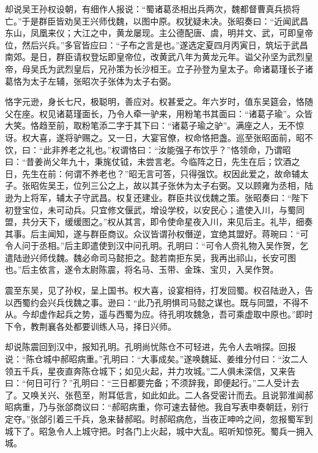 却说吴王孙权设朝，有细作人报说：“蜀诸葛丞相出兵两次，魏都督曹真兵损将亡。”于是群臣皆劝吴王兴师伐魏，以图中原。权犹疑未决。张昭奏曰：“近闻武昌东山，凤凰来仪；大江之中，黄龙屡现。主公德配唐、虞，明并文、武，可即皇帝位，然后兴兵。”多官皆应曰：“子布之言是也。”遂选定夏四月丙寅日，筑坛于武昌南郊。是日，群臣请权登坛即皇帝位，改黄武八年为黄龙元年。谥父孙坚为武烈皇帝，母吴氏为武烈皇后，兄孙策为长沙桓王。立子孙登为皇太子。命诸葛瑾长子诸葛恪为太子左辅，张昭次子张体为太子右弼。

恪字元逊，身长七尺，极聪明，善应对。权甚爱之。年六岁时，值东吴筵会，恪随父在座。权见诸葛瑾面长，乃令人牵一驴来，用粉笔书其面曰：“诸葛子瑜”。众皆大笑。恪趋至前，取粉笔添二字于其下曰：“诸葛子瑜之驴”。满座之人，无不惊讶。权大喜，遂将驴赐之。又一日，大宴官僚，权命恪把盏。巡至张昭面前，昭不饮，曰：“此非养老之礼也。”权谓恪曰：“汝能强子布饮乎？”恪领命，乃谓昭曰：“昔姜尚父年九十，秉旄仗钺，未尝言老。今临阵之日，先生在后；饮酒之日，先生在前：何谓不养老也？”昭无言可答，只得强饮。权因此爱之，故命辅太子。张昭佐吴王，位列三公之上，故以其子张休为太子右弼。又以顾雍为丞相，陆逊为上将军，辅太子守武昌。权复还建业。群臣共议伐魏之策。张昭奏曰：“陛下初登宝位，未可动兵。只宜修文偃武，增设学校，以安民心；遣使入川，与蜀同盟，共分天下，缓缓图之。”权从其言，即令使命星夜入川，来见后主。礼毕，细奏其事。后主闻知，遂与群臣商议。众议皆谓孙权僭逆，宜绝其盟好。蒋琬曰：“可令人问于丞相。”后主即遣使到汉中问孔明。孔明曰：“可令人赍礼物入吴作贺，乞遣陆逊兴师伐魏。魏必命司马懿拒之。懿若南拒东吴，我再出祁山，长安可图也。”后主依言，遂令太尉陈震，将名马、玉带、金珠、宝贝，入吴作贺。

震至东吴，见了孙权，呈上国书。权大喜，设宴相待，打发回蜀。权召陆逊入，告以西蜀约会兴兵伐魏之事。逊曰：“此乃孔明惧司马懿之谋也。既与同盟，不得不从。今却虚作起兵之势，遥与西蜀为应。待孔明攻魏急，吾可乘虚取中原也。”即时下令，教荆襄各处都要训练人马，择日兴师。

却说陈震回到汉中，报知孔明。孔明尚忧陈仓不可轻进，先令人去哨探。回报说：“陈仓城中郝昭病重。”孔明曰：“大事成矣。”遂唤魏延、姜维分付曰：“汝二人领五千兵，星夜直奔陈仓城下；如见火起，并力攻城。”二人俱未深信，又来告曰：“何日可行？”孔明曰：“三日都要完备；不须辞我，即便起行。”二人受计去了。又唤关兴、张苞至，附耳低言，如此如此。二人各受密计而去。且说郭淮闻郝昭病重，乃与张郃商议曰：“郝昭病重，你可速去替他。我自写表申奏朝廷，别行定夺。”张郃引着三千兵，急来替郝昭。时郝昭病危，当夜正呻吟之间，忽报蜀军到城下了。昭急令人上城守把。时各门上火起，城中大乱。昭听知惊死。蜀兵一拥入城。

